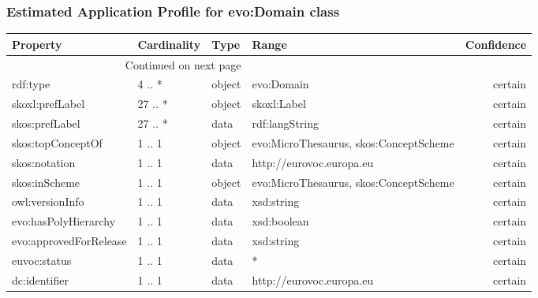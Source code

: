 \documentclass[10pt,a4paper,titlepage,final]{article}
\begin{document}
\subsubsection{Estimated Application Profile for evo:Domain class}
\begin{tabularx}{\textwidth}{lllXr}
\toprule
               Property & Cardinality &    Type &                                   Range & Confidence \\
\midrule
\endhead
\midrule
\multicolumn{3}{r}{{Continued on next page}} \\
\midrule
\endfoot

\bottomrule
\endlastfoot
               rdf:type &      4 .. * &  object &                              evo:Domain &    certain \\
        skoxl:prefLabel &     27 .. * &  object &                             skoxl:Label &    certain \\
         skos:prefLabel &     27 .. * &    data &                          rdf:langString &    certain \\
      skos:topConceptOf &      1 .. 1 &  object &  evo:MicroThesaurus, skos:ConceptScheme &    certain \\
          skos:notation &      1 .. 1 &    data &                http://eurovoc.europa.eu &    certain \\
          skos:inScheme &      1 .. 1 &  object &  evo:MicroThesaurus, skos:ConceptScheme &    certain \\
        owl:versionInfo &      1 .. 1 &    data &                              xsd:string &    certain \\
   evo:hasPolyHierarchy &      1 .. 1 &    data &                             xsd:boolean &    certain \\
 evo:approvedForRelease &      1 .. 1 &    data &                              xsd:string &    certain \\
           euvoc:status &      1 .. 1 &    data &                                       * &    certain \\
          dc:identifier &      1 .. 1 &    data &                http://eurovoc.europa.eu &    certain \\
\end{tabularx}
\end{document}

